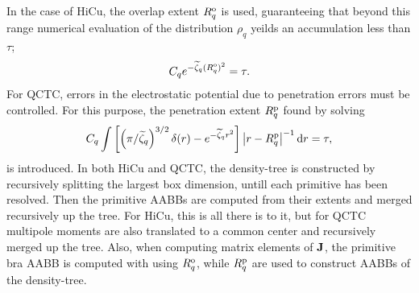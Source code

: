 \commentoutA{\documentclass[prb,aps,twocolumn,showpacs,twocolumngrid,superbib]{revtex4}}
\begin{document}
In the case of HiCu, the overlap extent $R^{\rm o}_q$ is used, guaranteeing that beyond this range 
numerical evaluation of the distribution $\rho_q$ yeilds an accumulation less than $\tau$;
\begin{equation}
C_q e^{ -\widetilde \zeta_q (R^{\rm o} _q)^2 }  = \tau .
\end{equation}
For QCTC,  errors in the electrostatic potential due to penetration errors must be controlled. 
For this purpose, the penetration extent $R^{\rm p}_q$  found by solving 
\begin{equation}
C_q \int \left[ \left(\pi/{\widetilde \zeta_q} \right)^{3/2} 
\delta({ r})  - e^{ -\widetilde \zeta_q {r}^2 } \right] \left|{ r}-{ R^{\rm p}_q} \right|^{-1} {\rm d} r = \tau ,
\end{equation}
is introduced.  In both HiCu and QCTC, the density-tree is constructed by recursively splitting the largest
box dimension, untill each primitive has been resolved.  Then the primitive AABBs are computed from their
extents and merged recursively up the tree.  For HiCu, this is all there is to it, but for QCTC multipole
moments are also translated to a common center and recursively merged up the tree.  Also, when computing 
matrix elements of $\bf J$, the primitive bra AABB is computed with using $R^{\rm o}_q$, while  $R^{\rm p}_q$ are 
used to construct AABBs of the density-tree.

\newpage
\newpage
\end{document}
